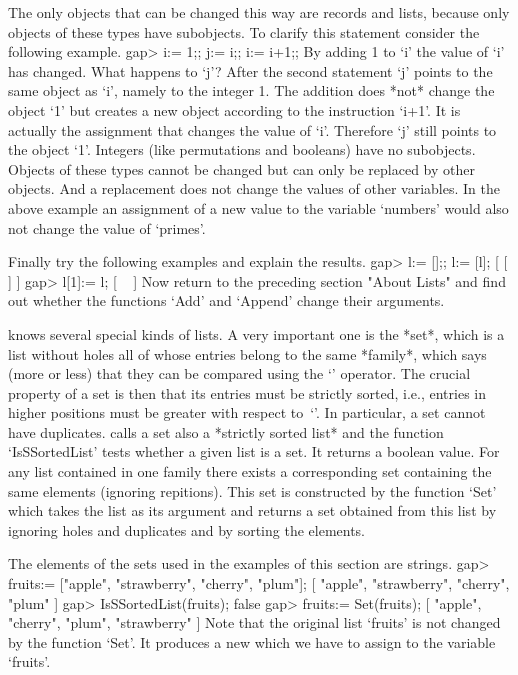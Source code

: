 The  only objects  that can be  changed  this way  are records and lists,
because only {\GAP} objects of  these  types have subobjects.  To clarify
this statement consider the following example.
\beginexample
    gap> i:= 1;; j:= i;; i:= i+1;; 
\endexample
By adding 1 to `i' the value of `i' has  changed.   What  happens to `j'?
After the second statement `j' points to the same object  as `i',  namely
to the  integer 1.  The  addition  does *not* change  the object `1'  but
creates a new object according  to the instruction `i+1'.  It is actually
the assignment that changes the value of `i'.  Therefore `j' still points
to  the object `1'.  Integers  (like permutations and  booleans)  have no
subobjects.  Objects  of these types  cannot  be  changed but can only be
replaced by other objects.   And a replacement does not change the values
of other variables.  In the above example an assignment of a new value to
the variable `numbers' would also not change the value of `primes'.

Finally try the following examples and explain the results.
\beginexample
    gap> l:= [];; l:= [l];
    [ [  ] ]
    gap> l[1]:= l;
    [ ~ ]
\endexample
Now return to the  preceding section  "About Lists" and  find out whether
the functions `Add' and `Append' change their arguments.


{\GAP} knows several special kinds of lists.  A very important one is the
*set*, which is a  list without holes all of  whose entries belong to the
same *family*, which says (more or less) that they  can be compared using
the `\<' operator. The crucial property of a set is then that its entries
must  be  strictly sorted,  i.e.,   entries in higher   positions must be
greater  with    respect to~`\<'.   In   particular, a    set cannot have
duplicates.   {\GAP}   calls   a   set     also  a    *strictly    sorted
list* and  the function `IsSSortedList' tests
whether a given list is  a set. It returns  a boolean value. For any list
contained in one  family there exists  a corresponding set containing the
same elements   (ignoring  repitions). This   set is  constructed  by the
function `Set'  which takes the  list as its argument   and returns a set
obtained from this list by  ignoring holes and  duplicates and by sorting
the elements.

The  elements  of  the  sets used  in  the  examples of this  section are
strings.
\beginexample
    gap> fruits:= ["apple", "strawberry", "cherry", "plum"];
    [ "apple", "strawberry", "cherry", "plum" ]
    gap> IsSSortedList(fruits);
    false
    gap> fruits:= Set(fruits);
    [ "apple", "cherry", "plum", "strawberry" ] 
\endexample
Note  that the  original list `fruits'  is not  changed  by the  function
`Set'.  It   produces a new  which  we  have to   assign to  the variable
`fruits'.

